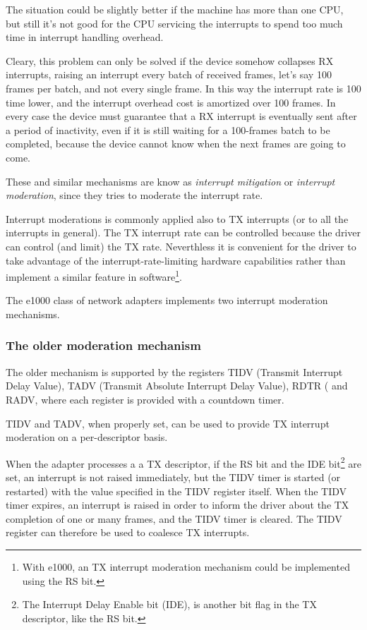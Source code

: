 The situation could be slightly better if the machine has more than one CPU, but still it's not good for the CPU servicing the interrupts
to spend too much time in interrupt handling overhead.

\vspace{0.5cm}

Cleary, this problem can only be solved if the device somehow collapses RX interrupts, raising an interrupt every batch of received
frames, let's say 100 frames per batch, and not every single frame. In this way the interrupt rate is 100 time lower, and the
interrupt overhead cost is amortized over 100 frames.
In every case the device must guarantee that a RX interrupt is eventually sent after a period of inactivity, even if it is still waiting
for a 100-frames batch to be completed, because the device cannot know when the next frames are going to come.

These and similar mechanisms are know as \emph{interrupt mitigation} or \emph{interrupt moderation}, since they tries to moderate the
interrupt rate.

Interrupt moderations is commonly applied also to TX interrupts (or to all the interrupts in general). The TX interrupt rate can be
controlled because the driver can control (and limit) the TX rate. Neverthless it is convenient for the driver to take advantage of
the interrupt-rate-limiting hardware capabilities rather than implement a similar feature in software\footnote{With e1000, an TX 
interrupt moderation mechanism could be implemented using the RS bit.}.

\vspace{0.5cm}

The e1000 class of network adapters implements two interrupt moderation mechanisms.

\subsubsection{The older moderation mechanism}
\label{sec:oldmit}
The older mechanism is supported by the registers TIDV (Transmit Interrupt Delay Value), TADV (Transmit Absolute Interrupt Delay Value),
RDTR ( and RADV, where each register is provided with a countdown timer.

\vspace{0.5cm}

TIDV and TADV, when properly set, can be used to provide TX interrupt moderation on a per-descriptor basis.

When the adapter processes a a TX descriptor, if the RS bit and the IDE bit\footnote{The Interrupt Delay Enable bit (IDE), is another
bit flag in the TX descriptor, like the RS bit.} are set, an interrupt is not raised immediately, but the TIDV timer is started (or
restarted) with the value specified in the TIDV register itself. When the TIDV timer expires, an interrupt is raised in order
to inform the driver about the TX completion of one or many frames, and the TIDV timer is cleared.
The TIDV register can therefore be used to coalesce TX interrupts.

